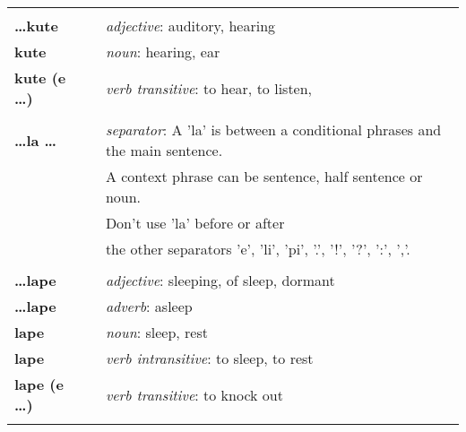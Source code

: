 \begin{supertabular}{p{2,5cm}|ll}
                                 &  &                                                                                                            \\ %
    \textbf{\dots kute}          &  & \textit{adjective}: auditory, hearing                                                                      \\
    \textbf{kute}                &  & \textit{noun}: hearing, ear                                                                                \\
    \textbf{kute (e \dots)}      &  & \textit{verb transitive}: to hear, to listen,                                                              \\
                                 &  &                                                                                                            \\ %
    \textbf{\dots la \dots}      &  & \textit{separator}:  A 'la' is between a conditional phrases and the main sentence.                        \\ && A context phrase can be sentence, half sentence or noun. \\ && Don't use 'la' before or after \\ && the other separators 'e', 'li', 'pi', '.', '!', '?', ':', ','.  \\
                                 &  &                                                                                                            \\ %
    \textbf{\dots lape}          &  & \textit{adjective}: sleeping, of sleep, dormant                                                            \\
    \textbf{\dots lape}          &  & \textit{adverb}: asleep                                                                                    \\
    \textbf{lape}                &  & \textit{noun}: sleep, rest                                                                                 \\
    \textbf{lape}                &  & \textit{verb intransitive}: to sleep, to rest                                                              \\
    \textbf{lape (e \dots)}      &  & \textit{verb transitive}: to knock out                                                                     \\
                                 &  &                                                                                                            \\ %

\end{supertabular}
